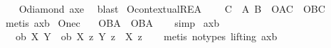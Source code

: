 \begin{isabellebody}
%
\isadelimproof
\ \ %
\endisadelimproof
%
\isatagproof
{}\isamarkupfalse%
\ O{\isacharunderscore}diamond\ ax{\isacharunderscore}{}e\ \isamarkupfalse%
\ blast\isanewline
%
%
\endisatagproof
{\isafoldproof}%
%
\isadelimproof
\isanewline
%
\endisadelimproof
\isanewline
{}\isamarkupfalse%
\ O{\isacharunderscore}contextual{\isacharunderscore}REA{\isacharcolon}\isanewline
\ \ \ {\isachardoublequoteopen}{\isasymTurnstile}\ {\isacharparenleft}{\isacharparenleft}{\isasymbox}{\isacharparenleft}C\ \isactrlbold {\isasymrightarrow}\ {\isacharparenleft}A\ \isactrlbold {\isasymequiv}B{\isacharparenright}{\isacharparenright}{\isacharparenright}\ \isactrlbold {\isasymrightarrow}\ {\isacharparenleft}O{\isacharbraceleft}A{\isacharbar}C{\isacharbraceright}\ \isactrlbold {\isasymequiv}\ O{\isacharbraceleft}B{\isacharbar}C{\isacharbraceright}{\isacharparenright}{\isacharparenright}{\isachardoublequoteclose}\isanewline
%
\isadelimproof
\ \ %
\endisadelimproof
%
\isatagproof
{}\isamarkupfalse%
\ {\isacharparenleft}metis\ ax{\isacharunderscore}{}b{\isacharparenright}\isanewline
%
%
\endisatagproof
{\isafoldproof}%
%
\isadelimproof
\isanewline
%
\endisadelimproof
\isanewline
{}\isamarkupfalse%
\ O{\isacharunderscore}nec{\isacharcolon}\isanewline
\ \ \ {\isachardoublequoteopen}{\isasymTurnstile}{\isacharparenleft}O{\isacharbraceleft}B{\isacharbar}A{\isacharbraceright}\ \isactrlbold {\isasymrightarrow}\ {\isacharparenleft}{\isasymbox}O{\isacharbraceleft}B{\isacharbar}A{\isacharbraceright}{\isacharparenright}{\isacharparenright}{\isachardoublequoteclose}\isanewline
%
\isadelimproof
\ \ %
\endisadelimproof
%
\isatagproof
{}\isamarkupfalse%
\ simp\isanewline
%
%
\endisatagproof
{\isafoldproof}%
%
\isadelimproof
\isanewline
%
\endisadelimproof
\isanewline
{}\isamarkupfalse%
\ ax{\isacharunderscore}{}b{\isacharprime}{\isacharprime}{\isacharcolon}\ \isanewline
\ \ \ {\isachardoublequoteopen}ob\ X\ Y\ {\isasymlongleftrightarrow}\ ob\ X\ {\isacharparenleft}{\isasymlambda}z{\isachardot}\ {\isacharparenleft}Y\ z{\isacharparenright}\ {\isasymand}\ {\isacharparenleft}X\ z{\isacharparenright}{\isacharparenright}{\isachardoublequoteclose}\isanewline
%
\isadelimproof
\ \ %
\endisadelimproof
%
\isatagproof
{}\isamarkupfalse%
\ {\isacharparenleft}metis\ {\isacharparenleft}no{\isacharunderscore}types{\isacharcomma}\ lifting{\isacharparenright}\ ax{\isacharunderscore}{}b{\isacharparenright}%

\end{isabellebody}
